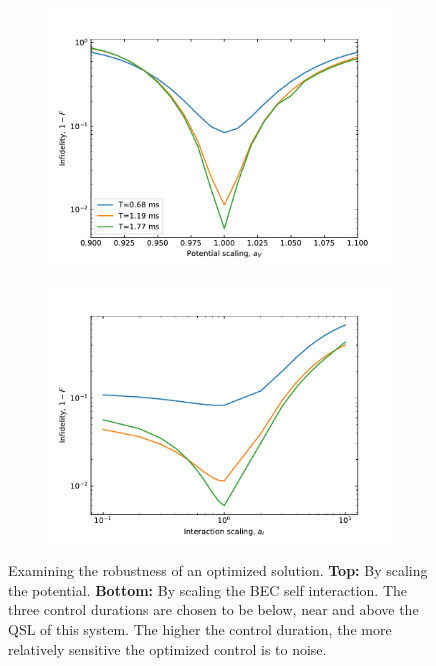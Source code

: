 \documentclass[a4paper, twocolumn]{revtex4-1}
\begin{document}
\begin{figure}
	\begin{subfigure}{\columnwidth}
		\centering
		\includegraphics[width=\columnwidth]{graphics/robustness/robustness.pdf}
	\end{subfigure}
	\begin{subfigure}{\columnwidth}
		\centering
		\includegraphics[width=\columnwidth]{graphics/robustness/interactionRobustness.pdf}
	\end{subfigure}
	\caption{Examining the robustness of an optimized solution. \textbf{Top:} By scaling the potential. \textbf{Bottom:} By scaling the BEC self interaction. The three control durations are chosen to be below, near and above the QSL of this system. The higher the control duration, the more relatively sensitive the optimized control is to noise.}
	\label{fig:robustness}
\end{figure}
\end{document}
